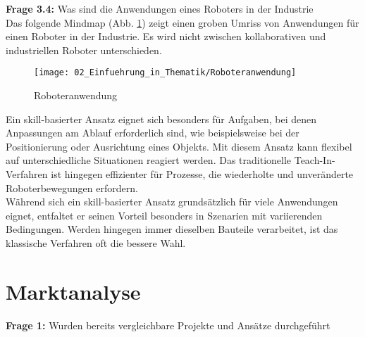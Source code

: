 	\vspace{3mm}
	
	\newpage
	
	\textbf{Frage 3.4:} Was sind die Anwendungen eines Roboters in der Industrie \vspace{2mm} 
	\\
		Das folgende Mindmap (Abb. \ref{fig:Roboteranwendung}) zeigt einen groben Umriss von Anwendungen für einen Roboter in der Industrie. Es wird nicht zwischen kollaborativen und industriellen Roboter unterschieden. 
		
		\begin{figure}[h!]
			\centering
			\texttt{[image: 02\_Einfuehrung\_in\_Thematik/Roboteranwendung]}
			\captionsetup{justification=centering}
			\caption{Roboteranwendung}
			\label{fig:Roboteranwendung}
		\end{figure}
		
		Ein skill-basierter Ansatz eignet sich besonders für Aufgaben, bei denen Anpassungen am Ablauf erforderlich sind, wie beispielsweise bei der Positionierung oder Ausrichtung eines Objekts. Mit diesem Ansatz kann flexibel auf unterschiedliche Situationen reagiert werden. Das traditionelle Teach-In-Verfahren ist hingegen effizienter für Prozesse, die wiederholte und unveränderte Roboterbewegungen erfordern.
		\\
		Während sich ein skill-basierter Ansatz grundsätzlich für viele Anwendungen eignet, entfaltet er seinen Vorteil besonders in Szenarien mit variierenden Bedingungen. Werden hingegen immer dieselben Bauteile verarbeitet, ist das klassische Verfahren oft die bessere Wahl.
		
		
	\vspace{3mm}

	\newpage


\section{Marktanalyse} \label{Marktanalyse}

	\textbf{Frage 1:} Wurden bereits vergleichbare Projekte und Ansätze durchgeführt \vspace{2mm} 
	\\
	
